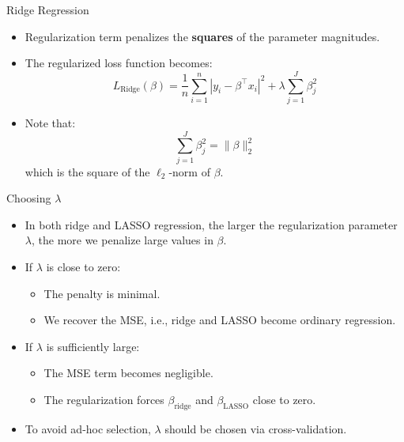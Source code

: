 \begin{frame}[allowframebreaks]{Ridge Regression}
    \begin{itemize}
        \item Regularization term penalizes the \textbf{squares} of the parameter magnitudes.
        \item The regularized loss function becomes:
        \[
            L_{\text{Ridge}}(\beta) = \frac{1}{n} \sum_{i=1}^{n} \left| y_i - \beta^\top x_i \right|^2 + \lambda \sum_{j=1}^{J} \beta_j^2
        \]
        \item Note that:
        \[
            \sum_{j=1}^{J} \beta_j^2 = \|\beta\|_2^2
        \]
        which is the square of the \( \ell_2 \)-norm of \( \beta \).
    \end{itemize}
\end{frame}


\begin{frame}{Choosing \( \lambda \)}
    \begin{itemize}
        \item In both ridge and LASSO regression, the larger the regularization parameter \( \lambda \), the more we penalize large values in \( \beta \).
        \item If \( \lambda \) is close to zero:
        \begin{itemize}
            \item The penalty is minimal.
            \item We recover the MSE, i.e., ridge and LASSO become ordinary regression.
        \end{itemize}
        \item If \( \lambda \) is sufficiently large:
        \begin{itemize}
            \item The MSE term becomes negligible.
            \item The regularization forces \( \beta_{\text{ridge}} \) and \( \beta_{\text{LASSO}} \) close to zero.
        \end{itemize}
        \item To avoid ad-hoc selection, \( \lambda \) should be chosen via cross-validation.
    \end{itemize}
\end{frame}


